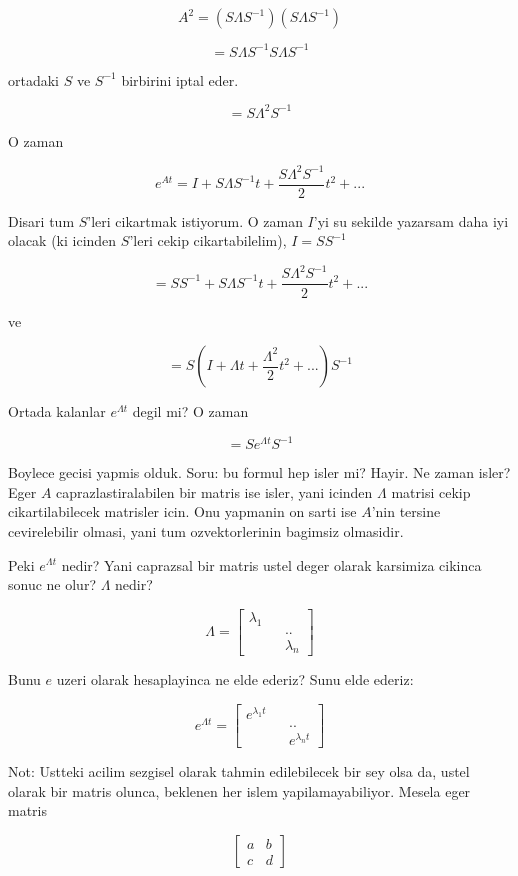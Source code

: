 \documentclass[12pt,fleqn]{article}\usepackage{../common}
\begin{document}
\[ A^2 = (S \Lambda S^{-1})(S \Lambda S^{-1}) \]

\[ = S \Lambda S^{-1}S \Lambda S^{-1} \]

ortadaki $S$ ve $S^{-1}$ birbirini iptal eder. 

\[ = S \Lambda^2 S^{-1} \]

O zaman 

\[ e^{At} = I + S \Lambda S^{-1} t + \frac{S \Lambda^2 S^{-1}}{2}t^2 + ...\]

Disari tum $S$'leri cikartmak istiyorum. O zaman $I$'yi su sekilde yazarsam
daha iyi olacak (ki icinden $S$'leri cekip cikartabilelim), $I = SS^{-1}$

\[ = SS^{-1} + S \Lambda S^{-1} t + \frac{S \Lambda^2 S^{-1}}{2}t^2 + ...\]

ve

\[ = S (I + \Lambda t + \frac{\Lambda^2}{2}t^2 + ...) S^{-1}\]

Ortada kalanlar $e^{\Lambda t}$ degil mi? O zaman

\[ = S e^{\Lambda t}S^{-1} \]

Boylece gecisi yapmis olduk. Soru: bu formul hep isler mi? Hayir. Ne zaman
isler? Eger $A$ caprazlastiralabilen bir matris ise isler, yani icinden
$\Lambda$ matrisi cekip cikartilabilecek matrisler icin. Onu yapmanin on
sarti ise $A$'nin tersine cevirelebilir olmasi, yani tum ozvektorlerinin
bagimsiz olmasidir.

Peki $e^{\Lambda t}$ nedir? Yani caprazsal bir matris ustel deger olarak
karsimiza cikinca sonuc ne olur? $\Lambda$ nedir?

\[ \Lambda =
\left[\begin{array}{ccc}
\lambda_1 && \\
&&.. \\
&& \lambda_n
\end{array}\right]
 \]

Bunu $e$ uzeri olarak hesaplayinca ne elde ederiz? Sunu elde ederiz:


\[ e^{\Lambda t} =
\left[\begin{array}{ccc}
e^{\lambda_1t} && \\
&&.. \\
&& e^{\lambda_n t}
\end{array}\right]
 \]

Not: Ustteki acilim sezgisel olarak tahmin edilebilecek bir sey olsa da,
ustel olarak bir matris olunca, beklenen her islem yapilamayabiliyor. Mesela 
eger matris

\[ 
\left[\begin{array}{cc}
a & b \\ c & d
\end{array}\right]
 \]
\end{document}
